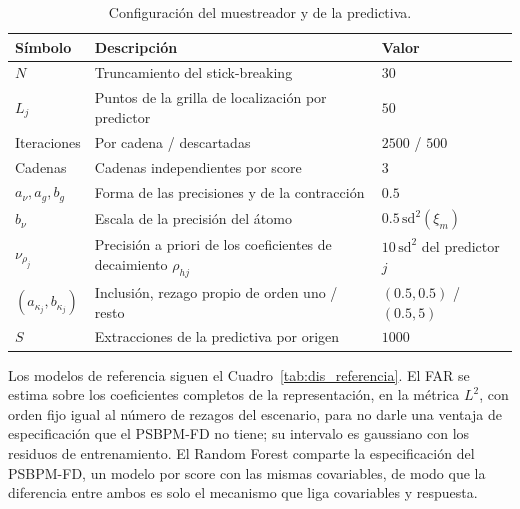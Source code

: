 \begin{table}[H]
\centering\small
\caption{Configuración del muestreador y de la predictiva.}
\label{tab:dis_mcmc}
\begin{tabular}{p{} p{} p{}}
\hline
Símbolo & Descripción & Valor \\
\hline
$N$                   & Truncamiento del stick-breaking                         & $30$ \\
$L_j$                 & Puntos de la grilla de localización por predictor       & $50$ \\
Iteraciones           & Por cadena / descartadas                                & $2500$ / $500$ \\
Cadenas               & Cadenas independientes por score                        & $3$ \\
$a_\nu, a_g, b_g$     & Forma de las precisiones y de la contracción            & $0.5$ \\
$b_\nu$               & Escala de la precisión del átomo                        & $0.5\,\mathrm{sd}^2(\xi_m)$ \\
$\nu_{\rho_j}$        & Precisión a priori de los coeficientes de decaimiento $\rho_{hj}$ & $10\,\mathrm{sd}^2$ del predictor $j$ \\
$(a_{\kappa_j}, b_{\kappa_j})$ & Inclusión, rezago propio de orden uno / resto      & $(0.5, 0.5)$ / $(0.5, 5)$ \\
$S$                   & Extracciones de la predictiva por origen                & $1000$ \\
\hline
\end{tabular}
\end{table}

Los modelos de referencia siguen el Cuadro~\ref{tab:dis_referencia}. El FAR se estima sobre los coeficientes completos de la representación, en la métrica $L^2$, con orden fijo igual al número de rezagos del escenario, para no darle una ventaja de especificación que el PSBPM-FD no tiene; su intervalo es gaussiano con los residuos de entrenamiento. El Random Forest comparte la especificación del PSBPM-FD, un modelo por score con las mismas covariables, de modo que la diferencia entre ambos es solo el mecanismo que liga covariables y respuesta.

